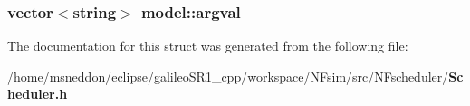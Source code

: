 \subsubsection{\setlength{\rightskip}{0pt plus 5cm}vector$<$string$>$ {\bf model::argval}}\label{structmodel_5c62b322d04127df8d6b29e0aa3155e0}




The documentation for this struct was generated from the following file:\begin{CompactItemize}
\item 
/home/msneddon/eclipse/galileoSR1\_\-cpp/workspace/NFsim/src/NFscheduler/{\bf Scheduler.h}\end{CompactItemize}
